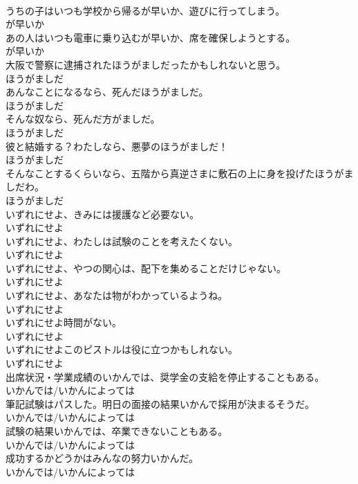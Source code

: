\documentclass[8pt]{extreport}
\begin{document}
\begin{CJK}{UTF8}{min}
\\	うちの子はいつも学校から帰るが早いか、遊びに行ってしまう。	
\\	が早いか	
\\	あの人はいつも電車に乗り込むが早いか、席を確保しようとする。	
\\	が早いか	
\\	大阪で警察に逮捕されたほうがましだったかもしれないと思う。	
\\	ほうがましだ	
\\	あんなことになるなら、死んだほうがましだ。	
\\	ほうがましだ	
\\	そんな奴なら、死んだ方がましだ。	
\\	ほうがましだ	
\\	彼と結婚する？わたしなら、悪夢のほうがましだ！	
\\	ほうがましだ	
\\	そんなことするくらいなら、五階から真逆さまに敷石の上に身を投げたほうがましだわ。	
\\	ほうがましだ	
\\	いずれにせよ、きみには援護など必要ない。	
\\	いずれにせよ	
\\	いずれにせよ、わたしは試験のことを考えたくない。	
\\	いずれにせよ	
\\	いずれにせよ、やつの関心は、配下を集めることだけじゃない。	
\\	いずれにせよ	
\\	いずれにせよ、あなたは物がわかっているようね。	
\\	いずれにせよ	
\\	いずれにせよ時間がない。	
\\	いずれにせよ	
\\	いずれにせよこのピストルは役に立つかもしれない。	
\\	いずれにせよ	
\\	出席状況・学業成績のいかんでは、奨学金の支給を停止することもある。	
\\	いかんでは/いかんによっては	
\\	筆記試験はパスした。明日の面接の結果いかんで採用が決まるそうだ。	
\\	いかんでは/いかんによっては	
\\	試験の結果いかんでは、卒業できないこともある。	
\\	いかんでは/いかんによっては	
\\	成功するかどうかはみんなの努力いかんだ。	
\\	いかんでは/いかんによっては	

\end{CJK}
\end{document}
